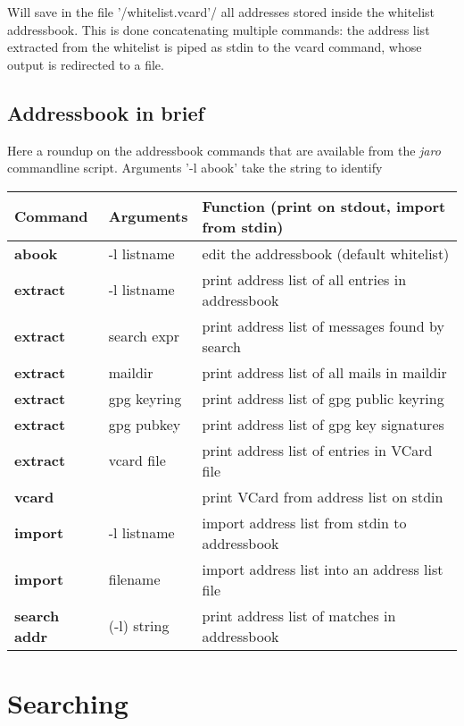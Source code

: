 \documentclass[a4,onecolumn,portrait]{article}
\begin{document}
Will save in the file '/whitelist.vcard'/ all addresses stored inside the whitelist addressbook. This is done concatenating multiple commands: the address list extracted from the whitelist is piped as stdin to the vcard command, whose output is redirected to a file.
\subsection{Addressbook in brief}
\label{sec-7-3}

Here a roundup on the addressbook commands that are available from the \emph{jaro} commandline script. Arguments '-l abook' take the string to identify

\begin{center}
\begin{tabular}{lll}
Command & Arguments & Function (print on stdout, import from stdin)\\
\hline
\textbf{abook} & -l listname & edit the addressbook (default whitelist)\\
\textbf{extract} & -l listname & print address list of all entries in addressbook\\
\textbf{extract} & search expr & print address list of messages found by search\\
\textbf{extract} & maildir & print address list of all mails in maildir\\
\textbf{extract} & gpg keyring & print address list of gpg public keyring\\
\textbf{extract} & gpg pubkey & print address list of gpg key signatures\\
\textbf{extract} & vcard file & print address list of entries in VCard file\\
\textbf{vcard} &  & print VCard from address list on stdin\\
\textbf{import} & -l listname & import address list from stdin to addressbook\\
\textbf{import} & filename & import address list into an address list file\\
\textbf{search addr} & (-l) string & print address list of matches in addressbook\\
\end{tabular}
\end{center}


\section{Searching}
\label{sec-8}
\end{document}
